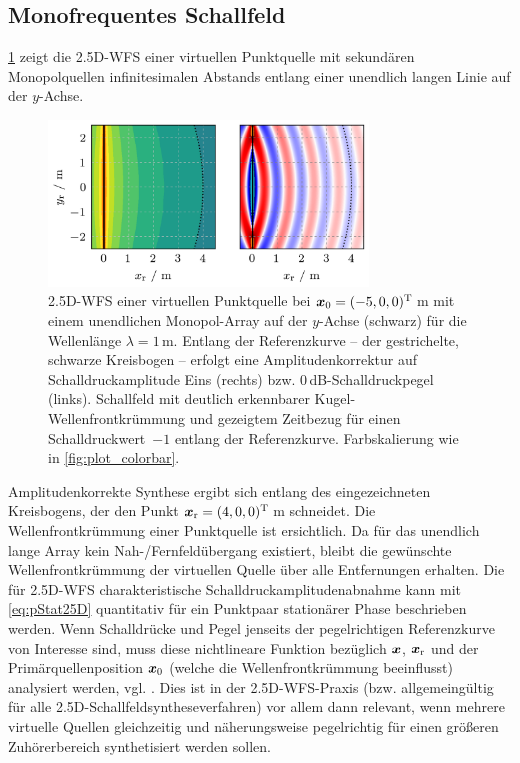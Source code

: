 \subsection{Monofrequentes Schallfeld}
%
\Abb\ref{fig:wfs25d_lineSSD} zeigt die 2.5D-WFS einer virtuellen Punktquelle
mit sekundären Monopolquellen infinitesimalen Abstands entlang einer unendlich
langen Linie auf der $y$-Achse.
%
\begin{figure}[t]
\centering
\begin{plotfigures}
\includegraphics[width=85mm]{../python/wfs25d_lineSSD.png}
\end{plotfigures}
\caption{2.5D-WFS einer virtuellen Punktquelle bei $\bm{x}_\mathrm{0} = (-5,0,0)^\mathrm{T}$\,m
mit einem unendlichen Monopol-Array auf der $y$-Achse (schwarz) für
die Wellenlänge $\lambda=1$\,m.
%
Entlang der Referenzkurve -- der gestrichelte, schwarze Kreisbogen -- erfolgt eine
Amplitudenkorrektur auf Schalldruckamplitude Eins (rechts) bzw. $0$\,dB-Schalldruckpegel (links).
%
Schallfeld mit deutlich erkennbarer Kugel-Wellenfrontkrümmung und gezeigtem
Zeitbezug für einen Schalldruckwert~$-1$ entlang der Referenzkurve.
%
Farbskalierung wie in \Abb\ref{fig:plot_colorbar}.
\cc
}
\label{fig:wfs25d_lineSSD}
\end{figure}
%
Amplitudenkorrekte Synthese ergibt sich entlang des eingezeichneten Kreisbogens,
der den Punkt $\bm{x}_\mathrm{r} = (4,0,0)^\mathrm{T}$\,m schneidet.
%
Die Wellenfrontkrümmung einer Punktquelle ist ersichtlich.
%
Da für das unendlich lange Array kein Nah-/Fernfeldübergang existiert,
bleibt die gewünschte Wellenfrontkrümmung der virtuellen Quelle
über alle Entfernungen erhalten.
%
Die für 2.5D-WFS charakteristische Schalldruckamplitudenabnahme
kann mit \Glg\eqref{eq:pStat25D} quantitativ für ein Punktpaar
stationärer Phase beschrieben werden.
%
Wenn Schalldrücke und Pegel jenseits der pegelrichtigen Referenzkurve von
Interesse sind, muss diese nichtlineare Funktion bezüglich $\bm{x}$, $\bm{x}_\mathrm{r}$ und
der Primärquellenposition
$\bm{x}_\mathrm{0}$ (welche die Wellenfrontkrümmung beeinflusst) analysiert
werden, vgl. \cite{Sonke2000_diss,Wittek2007_diss, Spors2010a}.
%
Dies ist in der 2.5D-WFS-Praxis (bzw. allgemeingültig für alle
2.5D-Schallfeldsyntheseverfahren) vor allem dann relevant, wenn mehrere virtuelle
Quellen gleichzeitig und näherungsweise pegelrichtig für einen größeren
Zuhörerbereich synthetisiert werden sollen.



